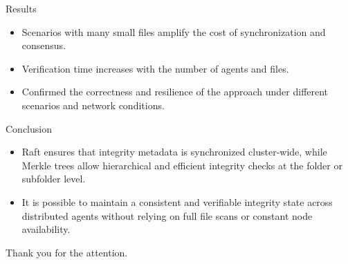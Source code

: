 \begin{frame}{Results}
\begin{itemize}
\item Scenarios with many small files amplify the cost of synchronization and
consensus.
\item Verification time increases with the number of agents and files.
\item Confirmed the correctness and resilience of the approach under different scenarios and network conditions.
\end{itemize}
\end{frame}

\begin{frame}{Conclusion}
\begin{itemize}
\item Raft ensures that integrity metadata is synchronized cluster-wide, while Merkle trees allow hierarchical and efficient integrity checks at the folder or subfolder level.
\item<2> It is possible to maintain a consistent and verifiable integrity state across distributed agents without relying on full file scans or constant node availability.
\end{itemize}
\end{frame}


\begin{frame}
\centering
    Thank you for the attention.\par
\end{frame}
